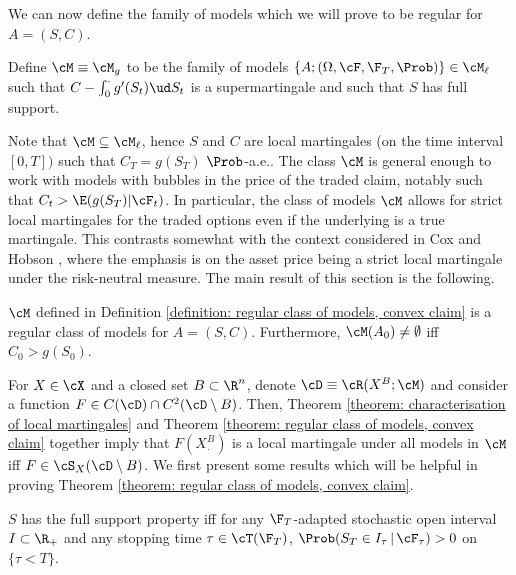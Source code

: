 \documentclass[11pt]{article}
\begin{document}
We can now define the family of models which we will prove to be regular for $A = (S,C)$.

\begin{definition}
\label{definition: regular class of models, convex claim}
Define $\cM \equiv \cM_g$ to be the family of models $\{ A ; (\Omega, \cF, \F_T, \Prob) \} \in \cM_\ell$ such that $C - \int_0^\cdot g^\prime(S_t) \ud S_t$ is a supermartingale and such that $S$ has full support.
\end{definition}

Note that $\cM \subseteq \cM_\ell$, hence $S$ and $C$ are local martingales (on the time interval $[0,T])$ such that $C_T = g(S_T)$ $\Prob$-a.e.. The class $\cM$ is general enough to work with models with bubbles in the price of the traded claim, notably such that $C_t > \E(g(S_T) | \cF_t)$. In particular, the class of models $\cM$ allows for strict local martingales for the traded options even if the underlying is a true martingale. This contrasts somewhat with the context considered in Cox and Hobson \cite{Cox-Hobson}, where the emphasis is on the asset price being a strict local martingale under the risk-neutral measure. The main result of this section is the following.

\begin{theorem}
\label{theorem: regular class of models, convex claim}
$\cM$ defined in Definition \ref{definition: regular class of models, convex claim} is a regular class of models for $A = (S,C)$. Furthermore, $\cM(A_0) \neq \emptyset$ iff $C_0 > g(S_0)$.
\end{theorem}

For $X \in \cX$ and a closed set $B \subset \R^n$, denote $\cD \equiv \cR(X^B; \cM)$ and consider a function $F \in C(\cD) \cap C^2(\cD \setminus B)$. Then, Theorem \ref{theorem: characterisation of local martingales} and Theorem \ref{theorem: regular class of models, convex claim} together imply that $F(X^B_\cdot)$ is a local martingale under all models in $\cM$ iff $F \in \cS_X(\cD \setminus B)$. We first present some results which will be helpful in proving Theorem \ref{theorem: regular class of models, convex claim}.

\begin{lemma}
\label{lemma: (FS) property with stopping times}
$S$ has the full support property iff for any $\F_T$-adapted stochastic open interval $I \subset \R_+$ and any stopping time $\tau \in \cT(\F_T)$, $\Prob(S_T \in I_\tau \, | \, \cF_\tau ) > 0$ on $\{ \tau < T \}$.
\end{lemma}
\end{document}
